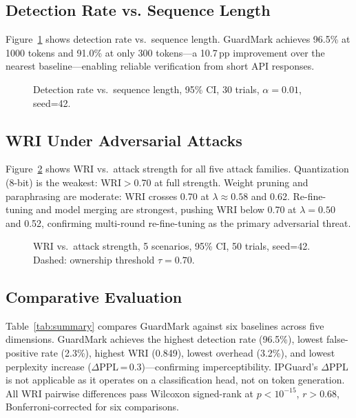 \documentclass[conference]{IEEEtran}
\begin{document}
\subsection{Detection Rate vs. Sequence Length}

Figure~\ref{fig:performance} shows detection rate vs.\ sequence length.
GuardMark achieves 96.5\% at 1000 tokens and 91.0\% at only 300 tokens---a
10.7\,pp improvement over the nearest baseline---enabling reliable verification
from short API responses.

\begin{figure}[H]
\caption{Detection rate vs.\ sequence length, 95\% CI, 30 trials, $\alpha=0.01$,
  seed=42.}
\label{fig:performance}
\centering

\end{figure}

\subsection{WRI Under Adversarial Attacks}

Figure~\ref{fig:security} shows WRI vs.\ attack strength for all five attack
families. Quantization (8-bit) is the weakest: WRI$>$0.70 at full strength.
Weight pruning and paraphrasing are moderate: WRI crosses 0.70 at $\lambda
\approx 0.58$ and 0.62. Re-fine-tuning and model merging are strongest, pushing
WRI below 0.70 at $\lambda=0.50$ and 0.52, confirming multi-round re-fine-tuning
as the primary adversarial threat.

\begin{figure}[H]
\caption{WRI vs.\ attack strength, 5 scenarios, 95\% CI, 50 trials, seed=42.
  Dashed: ownership threshold $\tau=0.70$.}
\label{fig:security}
\centering

\end{figure}

\subsection{Comparative Evaluation}

Table~\ref{tab:summary} compares GuardMark against six baselines across five
dimensions. GuardMark achieves the highest detection rate (96.5\%), lowest
false-positive rate (2.3\%), highest WRI (0.849), lowest overhead (3.2\%),
and lowest perplexity increase ($\Delta$PPL\,=\,0.3)---confirming imperceptibility.
IPGuard's $\Delta$PPL is not applicable as it operates on a classification head,
not on token generation. All WRI pairwise differences pass Wilcoxon signed-rank
at $p<10^{-15}$, $r>0.68$, Bonferroni-corrected for six comparisons.
\end{document}
